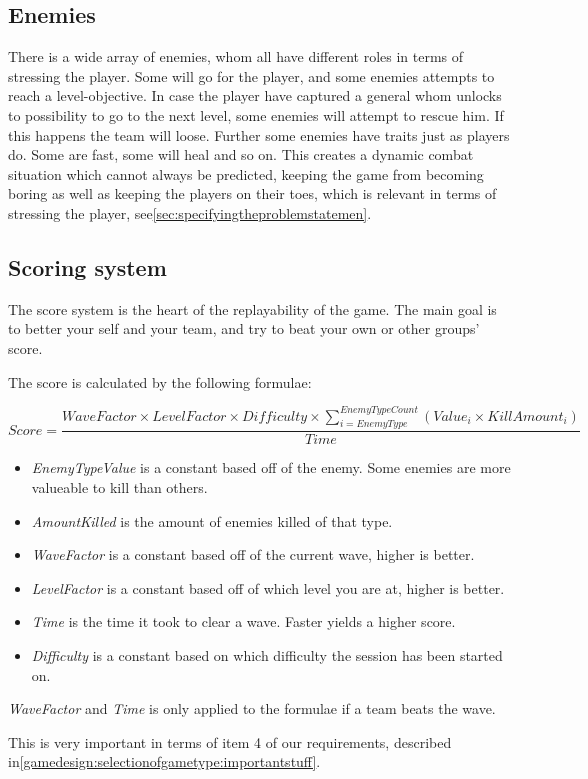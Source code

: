 \subsection{Enemies}
There is a wide array of enemies, whom all have different roles in terms of stressing the player. Some will go for the player, and some enemies attempts to reach a level-objective. In case the player have captured a general whom unlocks to possibility to go to the next level, some enemies will attempt to rescue him. If this happens the team will loose. 
Further some enemies have traits just as players do. Some are fast, some will heal and so on. This creates a dynamic combat situation which cannot always be predicted, keeping the game from becoming boring as well as keeping the players on their toes, which is relevant in terms of stressing the player, see\ref{sec:specifyingtheproblemstatemen}.

\subsection{Scoring system}\label{gamedesign:ourgame:scoring}
The score system is the heart of the replayability of the game. The main goal is to better your self and your team, and try to beat your own or other groups' score.

The score is calculated by the following formulae:

\begin{equation}\label{eq:score}
Score = \frac{WaveFactor \times LevelFactor \times Difficulty \times \sum\limits_{i=EnemyType}^{EnemyTypeCount}(Value_i \times KillAmount_i)}{Time}
\end{equation}

\begin{itemize}
\item \textit{EnemyTypeValue} is a constant based off of the enemy. Some enemies are more valueable to kill than others.
\item \textit{AmountKilled} is the amount of enemies killed of that type.
\item \textit{WaveFactor} is a constant based off of the current wave, higher is better.
\item \textit{LevelFactor} is a constant based off of which level you are at, higher is better.
\item \textit{Time} is the time it took to clear a wave. Faster yields a higher score.
\item \textit{Difficulty} is a constant based on which difficulty the session has been started on.
\end{itemize}

\emph{WaveFactor} and \emph{Time} is only applied to the formulae if a team beats the wave.

This is very important in terms of item 4 of our requirements, described in\ref{gamedesign:selectionofgametype:importantstuff}.
